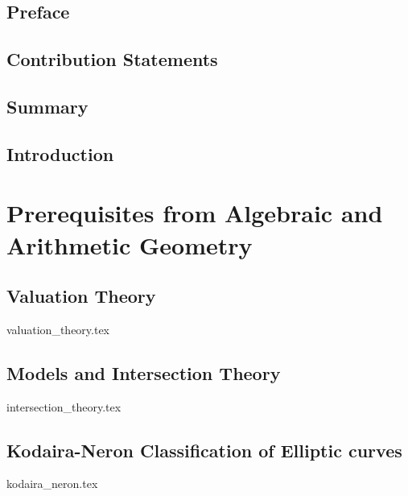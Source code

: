 


\rmfamily
\setcounter{page}{0}
\newpage
\chapter*{Preface} \label{chap:preface}
\chapter*{Contribution Statements} \label{chap:acknowledgements}
\chapter*{Summary} \label{chap:summary}

\myprintglossary
\myprintnomenclature
\tableofcontents
\listoftodos


\setcounter{page}{0}

\chapter{Introduction} \label{chap:introduction}
%

\part{Prerequisites from Algebraic and Arithmetic Geometry}
\chapter{Valuation Theory} \label{chap:valuation_theory}
{valuation_theory.tex}



\chapter{Models and Intersection Theory} \label{chap:models_and_intersection_theory}
{intersection_theory.tex}

\chapter{Kodaira-Neron Classification of Elliptic curves} \label{chap:kodaira_neron_classification_of_elliptic_curves}
{kodaira_neron.tex}

